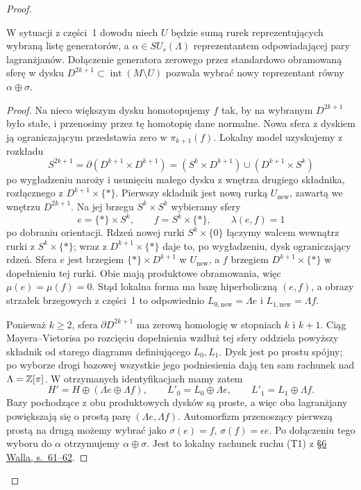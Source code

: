 \begin{proof}
\begin{lemat}
\label{lem:wall-odd-t1-22}
W sytuacji z części~1 dowodu niech $U$ będzie
sumą rurek reprezentujących wybraną listę
generatorów, a $\alpha\in SU_r(\Lambda)$
reprezentantem odpowiadającej pary lagranżjanów.
Dołączenie generatora zerowego przez standardowo
obramowaną sferę w dysku $D^{2k+1}\subset
\operatorname{int}(M\setminus U)$ pozwala wybrać
nowy reprezentant równy $\alpha\oplus\sigma$.
\end{lemat}
\begin{proof}
Na nieco większym dysku homotopujemy $f$ tak,
by na wybranym $D^{2k+1}$ było stałe, i przenosimy
przez tę homotopię dane normalne. Nowa sfera
z dyskiem ją ograniczającym przedstawia zero
w $\pi_{k+1}(f)$.
Lokalny model uzyskujemy z rozkładu
\[
 S^{2k+1}=\partial(D^{k+1}\times D^{k+1})
  =(S^k\times D^{k+1})\cup
    (D^{k+1}\times S^k)
\]
po wygładzeniu naroży i usunięciu małego dysku
z wnętrza drugiego składnika, rozłącznego z
$D^{k+1}\times\{*\}$. Pierwszy składnik
jest nową rurką $U_{\mathrm{new}}$, zawartą we
wnętrzu $D^{2k+1}$. Na jej brzegu
$S^k\times S^k$ wybieramy sfery
\[
 e=\{*\}\times S^k,\qquad
 f=S^k\times\{*\},
 \qquad\lambda(e,f)=1
\]
po dobraniu orientacji. Rdzeń nowej rurki
$S^k\times\{0\}$ łączymy walcem wewnątrz rurki
z $S^k\times\{*\}$; wraz z
$D^{k+1}\times\{*\}$ daje to, po wygładzeniu,
dysk ograniczający rdzeń.
Sfera $e$ jest brzegiem $\{*\}\times D^{k+1}$
w $U_{\mathrm{new}}$, a $f$ brzegiem
$D^{k+1}\times\{*\}$ w dopełnieniu tej rurki.
Obie mają produktowe obramowania, więc
$\mu(e)=\mu(f)=0$. Stąd lokalna forma ma bazę
hiperboliczną $(e,f)$, a obrazy strzałek
brzegowych z części~1 to odpowiednio
$L_{0,\mathrm{new}}=\Lambda e$ i
$L_{1,\mathrm{new}}=\Lambda f$.

Ponieważ $k\geq2$, sfera $\partial D^{2k+1}$
ma zerową homologię w stopniach $k$ i $k+1$.
Ciąg Mayera--Vietorisa po rozcięciu dopełnienia
wzdłuż tej sfery oddziela powyższy składnik
od starego diagramu definiującego $L_0,L_1$.
Dysk jest po prostu spójny; po wyborze drogi
bazowej wszystkie jego podniesienia dają ten
sam rachunek nad $\Lambda=\mathbb{Z}[\pi]$.
W otrzymanych identyfikacjach mamy zatem
\[
 H'=H\oplus(\Lambda e\oplus\Lambda f),\qquad
 L'_0=L_0\oplus\Lambda e,\qquad
 L'_1=L_1\oplus\Lambda f.
\]
Bazy pochodzące z obu produktowych dysków są
proste, a więc oba lagranżjany powiększają się
o prostą parę $(\Lambda e,\Lambda f)$.
Automorfizm przenoszący pierwszą prostą na drugą
możemy wybrać jako
$\sigma(e)=f$, $\sigma(f)=\epsilon e$.
Po dołączeniu tego wyboru do $\alpha$ otrzymujemy
$\alpha\oplus\sigma$.
Jest to lokalny rachunek ruchu (T1) z
\href{https://www.maths.ed.ac.uk/~v1ranick/books/scm.pdf}
{§6 Walla, s.~61--62}.
\end{proof}


\end{proof}
